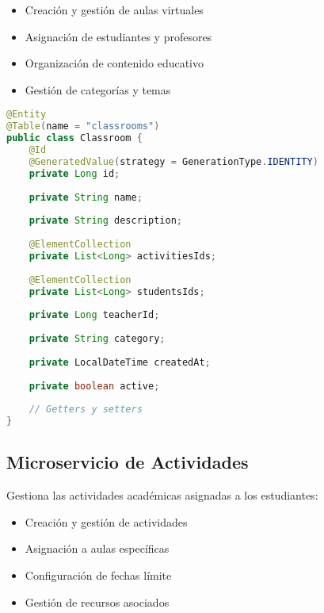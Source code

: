 \documentclass[12pt,a4paper]{report}
\begin{document}
\begin{itemize}
    \item Creación y gestión de aulas virtuales
    \item Asignación de estudiantes y profesores
    \item Organización de contenido educativo
    \item Gestión de categorías y temas
\end{itemize}

\begin{lstlisting}[language=Java, caption=Modelo de datos de Classroom]
@Entity
@Table(name = "classrooms")
public class Classroom {
    @Id
    @GeneratedValue(strategy = GenerationType.IDENTITY)
    private Long id;
    
    private String name;
    
    private String description;
    
    @ElementCollection
    private List<Long> activitiesIds;
    
    @ElementCollection
    private List<Long> studentsIds;
    
    private Long teacherId;
    
    private String category;
    
    private LocalDateTime createdAt;
    
    private boolean active;
    
    // Getters y setters
}
\end{lstlisting}

\subsection{Microservicio de Actividades}
Gestiona las actividades académicas asignadas a los estudiantes:

\begin{itemize}
    \item Creación y gestión de actividades
    \item Asignación a aulas específicas
    \item Configuración de fechas límite
    \item Gestión de recursos asociados
\end{itemize}
\end{document}
